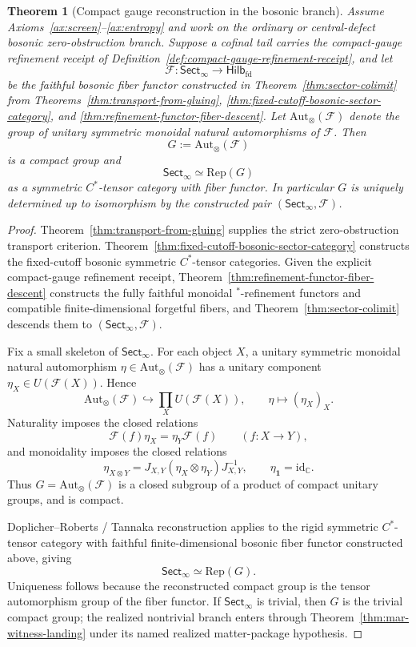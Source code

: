\documentclass[11pt]{article}
\newtheorem{theorem}{Theorem}[section]
\begin{document}
\begin{theorem}[Compact gauge reconstruction in the bosonic branch]\label{thm:compactgauge}
Assume Axioms~\ref{ax:screen}--\ref{ax:entropy} and work on the ordinary or central-defect
bosonic zero-obstruction branch. Suppose a cofinal tail carries the compact-gauge refinement
receipt of Definition~\ref{def:compact-gauge-refinement-receipt}, and let
\[
\mathcal F:\mathsf{Sect}_\infty\to\mathsf{Hilb}_{\mathrm{fd}}
\]
be the faithful bosonic fiber functor constructed in Theorem~\ref{thm:sector-colimit} from
Theorems~\ref{thm:transport-from-gluing},
\ref{thm:fixed-cutoff-bosonic-sector-category}, and
\ref{thm:refinement-functor-fiber-descent}. Let
\(\mathrm{Aut}_\otimes(\mathcal F)\) denote the group of unitary symmetric
monoidal natural automorphisms of \(\mathcal F\). Then
\[
G:=\mathrm{Aut}_\otimes(\mathcal F)
\]
is a compact group and
\[
\mathsf{Sect}_\infty\simeq \mathrm{Rep}(G)
\]
as a symmetric \(C^*\)-tensor category with fiber functor. In particular \(G\) is uniquely
determined up to isomorphism by the constructed pair \((\mathsf{Sect}_\infty,\mathcal F)\).
\end{theorem}

\begin{proof}
Theorem~\ref{thm:transport-from-gluing} supplies
the strict zero-obstruction transport criterion. Theorem~\ref{thm:fixed-cutoff-bosonic-sector-category}
constructs the fixed-cutoff bosonic symmetric \(C^*\)-tensor categories.
Given the explicit compact-gauge refinement receipt,
Theorem~\ref{thm:refinement-functor-fiber-descent} constructs the fully faithful monoidal
\(^*\)-refinement functors and compatible finite-dimensional forgetful fibers, and
Theorem~\ref{thm:sector-colimit} descends them to \((\mathsf{Sect}_\infty,\mathcal F)\).

Fix a small skeleton of \(\mathsf{Sect}_\infty\). For each object \(X\), a unitary symmetric
monoidal natural automorphism \(\eta\in\mathrm{Aut}_\otimes(\mathcal F)\) has a unitary component
\(\eta_X\in U(\mathcal F(X))\). Hence
\[
\mathrm{Aut}_\otimes(\mathcal F)
\hookrightarrow
\prod_X U(\mathcal F(X)),
\qquad
\eta\mapsto(\eta_X)_X.
\]
Naturality imposes the closed relations
\[
\mathcal F(f)\eta_X=\eta_Y\mathcal F(f)
\qquad(f:X\to Y),
\]
and monoidality imposes the closed relations
\[
\eta_{X\otimes Y}
=
J_{X,Y}(\eta_X\otimes\eta_Y)J_{X,Y}^{-1},
\qquad
\eta_{\mathbf 1}=\mathrm{id}_{\mathbb C}.
\]
Thus \(G=\mathrm{Aut}_\otimes(\mathcal F)\) is a closed subgroup of a product of compact unitary
groups, and is compact.

Doplicher--Roberts / Tannaka reconstruction applies to the rigid symmetric \(C^*\)-tensor
category with faithful finite-dimensional bosonic fiber functor constructed above, giving
\[
\mathsf{Sect}_\infty\simeq\mathrm{Rep}(G).
\]
Uniqueness follows because the reconstructed compact group is the tensor automorphism group of
the fiber functor. If \(\mathsf{Sect}_\infty\) is trivial, then \(G\) is the trivial compact group;
the realized nontrivial branch enters through Theorem~\ref{thm:mar-witness-landing} under its
named realized matter-package hypothesis.
\end{proof}
\end{document}
